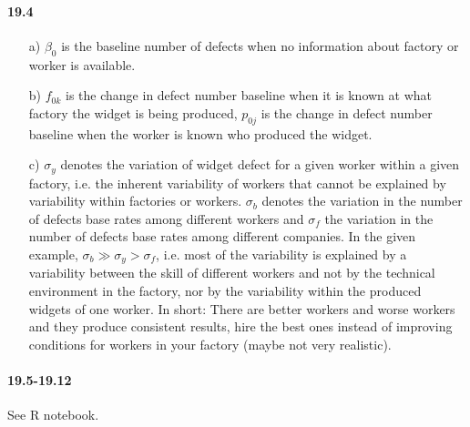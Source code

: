 \documentclass[fontsize=11pt,DIV=18,parskip=half]{scrartcl}
\begin{document}
\paragraph{19.4}
\begin{itemize}
\item[a)] $\beta_0$ is the baseline number of defects when no information about factory or worker is available.
\item[b)] $f_{0k}$ is the change in defect number baseline when it is known at what factory the widget is being produced, $p_{0j}$ is the change in defect number baseline when the worker is known who produced the widget.
\item[c)] $\sigma_y$ denotes the variation of widget defect for a given worker within a given factory, i.e. the inherent variability of workers that cannot be explained by variability within factories or workers. $\sigma_b$ denotes the variation in the number of defects base rates among different workers and $\sigma_f$ the variation in the number of defects base rates among different companies. In the given example, $\sigma_b \gg \sigma_y > \sigma_f$, i.e. most of the variability is explained by a variability between the skill of different workers and not by the technical environment in the factory, nor by the variability within the produced widgets of one worker. In short: There are better workers and worse workers and they produce consistent results, hire the best ones instead of improving conditions for workers in your factory (maybe not very realistic).
\end{itemize}

\paragraph{19.5-19.12} See R notebook.
\end{document}

